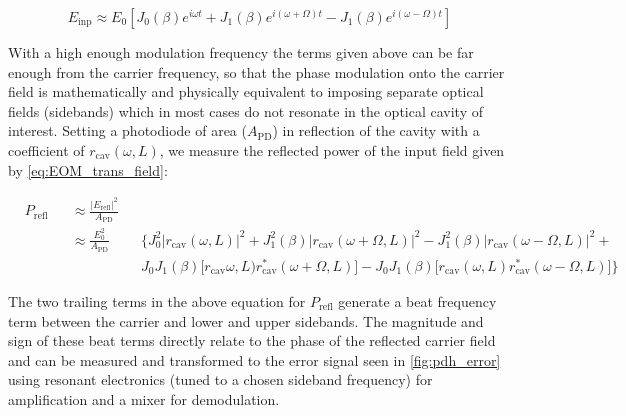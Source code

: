 \begin{equation} \label{eq:EOM_trans_field}
E_\mathrm{inp} \approx E_0 [J_0(\beta)e^{i \omega t} + J_1(\beta)e^{i (\omega + \Omega) t} - J_1(\beta)e^{i(\omega -\Omega)t}]
\end{equation}

With a high enough modulation frequency the terms given above can be far enough from the carrier frequency, so that the phase modulation onto the carrier field is mathematically and physically equivalent to imposing separate optical fields (sidebands) which in most cases do not resonate in the optical cavity of interest. Setting a photodiode of area ($A_\mathrm{PD}$) in reflection of the cavity with a coefficient of $r_\mathrm{cav}(\omega,L)$, we measure the reflected power of the input field given by \ref{eq:EOM_trans_field}:

\begin{equation}
 \begin{alignedat}{3}
    &P_\mathrm{refl} && \approx \frac{|E_\mathrm{refl}|^2}{A_\mathrm{PD}} && \\
    & &&\approx \frac{E_0^2}{A_\mathrm{PD}} && \bigg\{J_0^2 |r_\mathrm{cav}(\omega,L)|^2 + J_1^2(\beta)|r_\mathrm{cav}(\omega+\Omega,L)|^2 - J_1^2(\beta)|r_\mathrm{cav}(\omega-\Omega,L)|^2 +  \\
    & && && J_0J_1(\beta)\big[r_\mathrm{cav}\omega,L) r_\mathrm{cav}^*(\omega+\Omega,L)\big] - J_ 0J_1(\beta)\big[r_\mathrm{cav}(\omega,L)r_\mathrm{cav}^*(\omega-\Omega,L)\big]\bigg\}
  \end{alignedat}
\end{equation}

The two trailing terms in the above equation for $P_\mathrm{refl}$ generate a beat frequency term between the carrier and lower and upper sidebands. The magnitude and sign of these beat terms directly relate to the phase of the reflected carrier field and can be measured and transformed to the error signal seen in \ref{fig:pdh_error} using resonant electronics (tuned to a chosen sideband frequency) for amplification and a mixer for demodulation.

